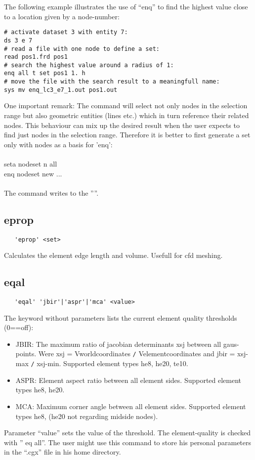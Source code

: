 \documentclass{article}
\begin{document}
The following example illustrates the use of ``enq'' to find the highest value close to a location given by a node-number: 
\begin{verbatim}
# activate dataset 3 with entity 7:
ds 3 e 7
# read a file with one node to define a set:
read pos1.frd pos1
# search the highest value around a radius of 1:
enq all t set pos1 1. h
# move the file with the search result to a meaningfull name:
sys mv enq_lc3_e7_1.out pos1.out
\end{verbatim}

One important remark:
The command will select not only nodes in the selection range but also geometric entities (lines etc.) which in turn reference their related nodes. This behaviour can mix up the desired result when the user expects to find just nodes in the selection range. Therefore it is better to first generate a set only with nodes as a basis for 'enq':\\\\
seta nodeset n all\\
enq nodeset new ...\\\\
The command writes to the ''''.


\subsection{\label{eprop}eprop}
\begin{verbatim}
   'eprop' <set>
\end{verbatim}
Calculates the element edge length and volume. Usefull for cfd meshing.

\subsection{\label{eqal}eqal}
\begin{verbatim}
   'eqal' 'jbir'|'aspr'|'mca' <value>
\end{verbatim}
The keyword without parameters lists the current element quality thresholds (0==off):
\begin{itemize}
\item JBIR: The maximum ratio of jacobian determinants xsj between all gaus-points. Were xsj = Vworldcoordinates \verb_/_ Velementcoordinates and jbir = xsj-max \verb_/_ xsj-min. Supported element types he8, he20, te10.
\item ASPR: Element aspect ratio between all element sides. Supported element types he8, he20.
\item MCA: Maximum corner angle between all element sides. Supported element types he8, (he20 not regarding midside nodes).
\end{itemize}
Parameter ``value'' sets the value of the threshold. The element-quality is checked with '' eq all''. The user might use this command to store his personal parameters in the ``.cgx'' file in his home directory.
\end{document}
